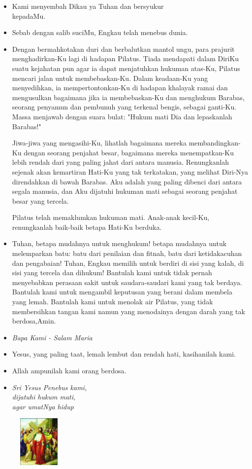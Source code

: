 \documentclass[a5paper,headsepline,titlepage,10pt,nnormalheadings,DIVcalc]{scrbook}
\newcommand{\BU}[1]{\begin{itemize} \item[U:] #1 \end{itemize}}
\newcommand{\BP}[1]{\begin{itemize} \item[P:] #1 \end{itemize}}
\newcommand{\kamiMenyembah}{\BP{ Kami menyembah Dikau ya Tuhan dan bersyukur\\kepadaMu.}
\BU{ Sebab dengan salib suciMu, Engkau telah menebus dunia.}
}
\newcommand{\kasihanilahKami}{\BP{Yesus, yang paling taat, lemah lembut dan rendah hati, kasihanilah kami.}
\BU{Allah ampunilah kami orang berdosa.}}
\begin{document}
\kamiMenyembah
\BP{Dengan bermahkotakan duri dan berbalutkan mantol ungu, para prajurit menghadirkan-Ku lagi di hadapan Pilatus. Tiada mendapati dalam DiriKu suatu kejahatan pun agar ia dapat menjatuhkan hukuman atas-Ku, Pilatus mencari jalan untuk membebaskan-Ku. Dalam keadaan-Ku yang menyedihkan, ia mempertontonkan-Ku di hadapan khalayak ramai dan mengusulkan bagaimana jika ia membebaskan-Ku dan menghukum Barabas, seorang penyamun dan pembunuh yang terkenal bengis, sebagai ganti-Ku. Massa menjawab dengan suara bulat: "Hukum mati Dia dan lepaskanlah Barabas!"

Jiwa-jiwa yang mengasihi-Ku, lihatlah bagaimana mereka membandingkan-Ku dengan seorang penjahat besar, bagaimana mereka menempatkan-Ku lebih rendah dari yang paling jahat dari antara manusia. Renungkanlah sejenak akan kemartiran Hati-Ku yang tak terkatakan, yang melihat Diri-Nya direndahkan di bawah Barabas. Aku adalah yang paling dibenci dari antara segala manusia, dan Aku dijatuhi hukuman mati sebagai seorang penjahat besar yang tercela.

Pilatus telah memaklumkan hukuman mati. Anak-anak kecil-Ku, renungkanlah baik-baik betapa Hati-Ku berduka.}

\BU{Tuhan, betapa mudahnya untuk menghukum! betapa mudahnya untuk melemparkan batu: batu dari penilaian dan fitnah, batu dari ketidakacuhan dan pengabaian! Tuhan, Engkau memilih untuk berdiri di sisi yang kalah, di sisi yang tercela dan dihukum!
Bantulah kami untuk tidak pernah menyebabkan perasaan sakit untuk saudara-saudari kami yang tak berdaya. Bantulah kami untuk mengambil keputusan yang berani dalam membela yang lemah. Bantulah kami untuk menolak air Pilatus, yang tidak membersihkan tangan kami namun yang menodainya dengan darah yang tak berdosa,Amin.}
 
\large\begin{itemize}\item[~]\it{Bapa Kami - Salam Maria}\end{itemize}\normalsize

\kasihanilahKami

\begin{itemize}
\item[2.] \it{Sri Yesus Penebus kami,\\ 
	dijatuhi hukum mati,\\ 
	agar umatNya hidup}
\end{itemize}



\begin{figure}
\includegraphics[width=2cm]{jalansalib_files/02_small.jpg}
\end{figure}
\end{document}
